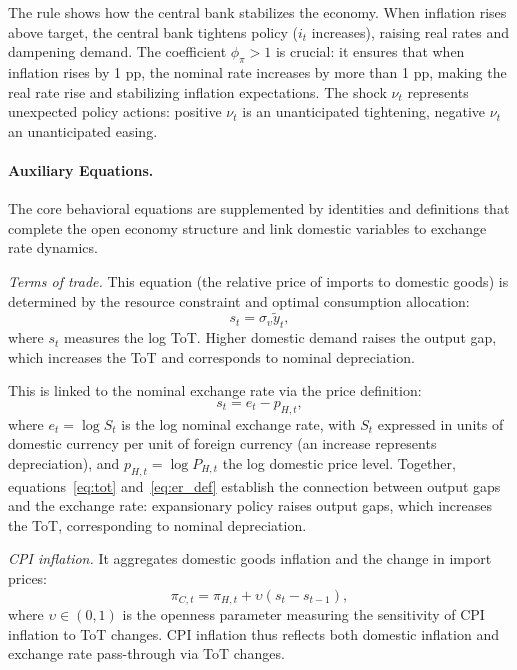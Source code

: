 \documentclass[12pt,a4paper]{article}
\begin{document}
The rule shows how the central bank stabilizes the economy. When inflation rises above target, the central bank tightens policy ($i_t$ increases), raising real rates and dampening demand. The coefficient $\phi_\pi > 1$ is crucial: it ensures that when inflation rises by 1 pp, the nominal rate increases by more than 1 pp, making the real rate rise and stabilizing inflation expectations. The shock $\nu_t$ represents unexpected policy actions: positive $\nu_t$ is an unanticipated tightening, negative $\nu_t$ an unanticipated easing.


\paragraph{Auxiliary Equations.}
The core behavioral equations are supplemented by identities and definitions that complete the open economy structure and link domestic variables to exchange rate dynamics.

\textit{Terms of trade.} This equation (the relative price of imports to domestic goods) is determined by the resource constraint and optimal consumption allocation:
\begin{equation}
	s_t = \sigma_\upsilon\tilde{y}_t,
	\label{eq:tot}
\end{equation}
where $s_t$ measures the log ToT. Higher domestic demand raises the output gap, which increases the ToT and corresponds to nominal depreciation.

This is linked to the nominal exchange rate via the price definition:
\begin{equation}
	s_t = e_t - p_{H,t},
	\label{eq:er_def}
\end{equation}
where $e_t = \log S_t$ is the log nominal exchange rate, with $S_t$ expressed in units of domestic currency per unit of foreign currency (an increase represents depreciation), and $p_{H,t} = \log P_{H,t}$ the log domestic price level. Together, equations~\eqref{eq:tot} and~\eqref{eq:er_def} establish the connection between output gaps and the exchange rate: expansionary policy raises output gaps, which increases the ToT, corresponding to nominal depreciation.


\textit{CPI inflation.} It aggregates domestic goods inflation and the change in import prices:
\begin{equation}
	\pi_{C,t} = \pi_{H,t} + \upsilon(s_t - s_{t-1}),
	\label{eq:CPI_baseline}
\end{equation}
where $\upsilon \in (0,1)$ is the openness parameter measuring the sensitivity of CPI inflation to ToT changes. CPI inflation thus reflects both domestic inflation and exchange rate pass-through via ToT changes.
\end{document}
